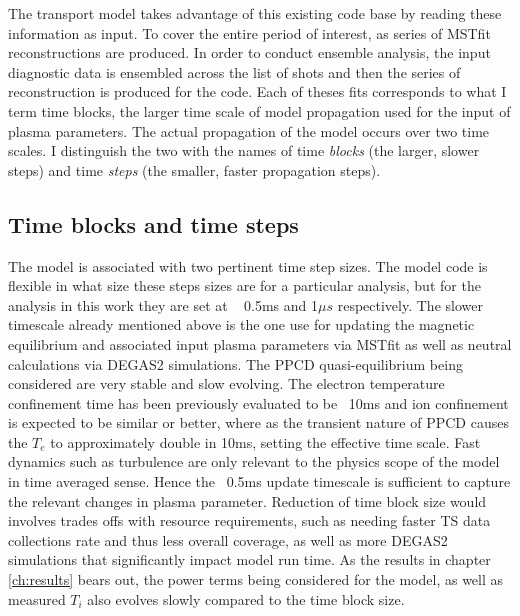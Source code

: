 The transport model takes advantage of this existing code base by reading these information as input. To cover the entire period of interest, as series of MSTfit reconstructions are produced. In order to conduct ensemble analysis, the input diagnostic data is ensembled across the list of shots and then the series of reconstruction is produced for the code. Each of theses fits corresponds to what I term time blocks, the larger time scale of model propagation used for the input of plasma parameters. The actual propagation of the model occurs over two time scales. I distinguish the two with the names of time \textit{blocks} (the larger, slower steps) and time \textit{steps} (the smaller, faster propagation steps). 


\subsection{Time blocks and time steps}\label{sec:time_blocks_and_steps}

The model is associated with two pertinent time step sizes. The model code is flexible in what size these steps sizes are for a particular analysis, but for the analysis in this work they are set at ~ 0.5ms and 1$\mu s$ respectively. The slower timescale already mentioned above is the one use for updating the magnetic equilibrium and associated input plasma parameters via MSTfit as well as neutral calculations via DEGAS2 simulations. The PPCD quasi-equilibrium being considered are very stable and slow evolving. The electron temperature confinement time has been previously evaluated to be ~10ms\cite{Chapman2001} and ion confinement is expected to be similar or better, where as the transient nature of PPCD causes the $T_e$ to approximately double in 10ms, setting the effective time scale. Fast dynamics such as turbulence are only relevant to the physics scope of the model in time averaged sense. Hence the ~0.5ms update timescale is sufficient to capture the relevant changes in plasma parameter. Reduction of time block size would involves trades offs with resource requirements, such as needing faster TS data collections rate and thus less overall coverage, as well as more DEGAS2 simulations that significantly impact model run time. As the results in chapter \ref{ch:results} bears out, the power terms being considered for the model, as well as measured $T_i$ also evolves slowly compared to the time block size.

